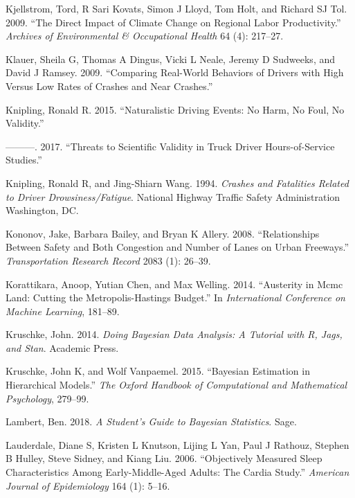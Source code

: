 \documentclass[12pt]{book}
\numberwithin{equation}{chapter}
\begin{document}
\leavevmode\hypertarget{ref-kjellstrom2009direct}{}%
Kjellstrom, Tord, R Sari Kovats, Simon J Lloyd, Tom Holt, and Richard SJ Tol. 2009. ``The Direct Impact of Climate Change on Regional Labor Productivity.'' \emph{Archives of Environmental \& Occupational Health} 64 (4): 217--27.

\leavevmode\hypertarget{ref-klauer2009comparing}{}%
Klauer, Sheila G, Thomas A Dingus, Vicki L Neale, Jeremy D Sudweeks, and David J Ramsey. 2009. ``Comparing Real-World Behaviors of Drivers with High Versus Low Rates of Crashes and Near Crashes.''

\leavevmode\hypertarget{ref-knipling2015naturalistic}{}%
Knipling, Ronald R. 2015. ``Naturalistic Driving Events: No Harm, No Foul, No Validity.''

\leavevmode\hypertarget{ref-knipling2017threats}{}%
---------. 2017. ``Threats to Scientific Validity in Truck Driver Hours-of-Service Studies.''

\leavevmode\hypertarget{ref-knipling1994crashes}{}%
Knipling, Ronald R, and Jing-Shiarn Wang. 1994. \emph{Crashes and Fatalities Related to Driver Drowsiness/Fatigue}. National Highway Traffic Safety Administration Washington, DC.

\leavevmode\hypertarget{ref-kononov2008relationships}{}%
Kononov, Jake, Barbara Bailey, and Bryan K Allery. 2008. ``Relationships Between Safety and Both Congestion and Number of Lanes on Urban Freeways.'' \emph{Transportation Research Record} 2083 (1): 26--39.

\leavevmode\hypertarget{ref-korattikara2014austerity}{}%
Korattikara, Anoop, Yutian Chen, and Max Welling. 2014. ``Austerity in Mcmc Land: Cutting the Metropolis-Hastings Budget.'' In \emph{International Conference on Machine Learning}, 181--89.

\leavevmode\hypertarget{ref-kruschke2014doing}{}%
Kruschke, John. 2014. \emph{Doing Bayesian Data Analysis: A Tutorial with R, Jags, and Stan}. Academic Press.

\leavevmode\hypertarget{ref-kruschke2015bayesian}{}%
Kruschke, John K, and Wolf Vanpaemel. 2015. ``Bayesian Estimation in Hierarchical Models.'' \emph{The Oxford Handbook of Computational and Mathematical Psychology}, 279--99.

\leavevmode\hypertarget{ref-lambert2018student}{}%
Lambert, Ben. 2018. \emph{A Student's Guide to Bayesian Statistics}. Sage.

\leavevmode\hypertarget{ref-lauderdale2006objectively}{}%
Lauderdale, Diane S, Kristen L Knutson, Lijing L Yan, Paul J Rathouz, Stephen B Hulley, Steve Sidney, and Kiang Liu. 2006. ``Objectively Measured Sleep Characteristics Among Early-Middle-Aged Adults: The Cardia Study.'' \emph{American Journal of Epidemiology} 164 (1): 5--16.
\end{document}
